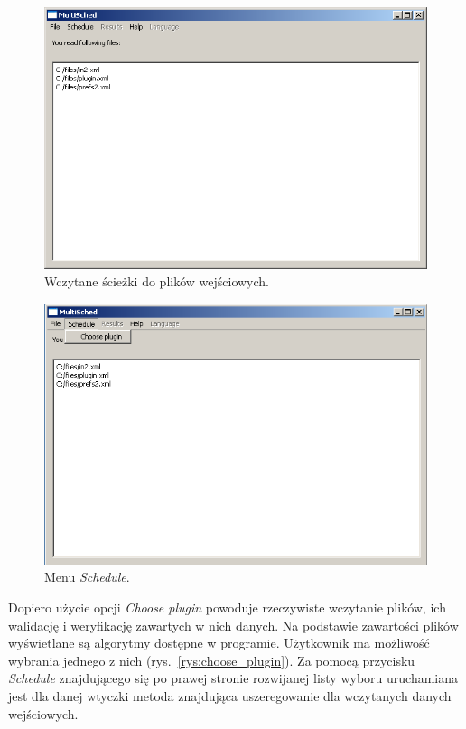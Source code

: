 \begin{figure}[htp]
\centering\includegraphics[scale=0.8]{figures/screens/read_files.png}
\caption{Wczytane ścieżki do plików wejściowych.}\label{rys:read_files}
\end{figure}

\begin{figure}[htp]
\centering\includegraphics[scale=0.8]{figures/screens/menu_schedule.png}
\caption{Menu \emph{Schedule}.}\label{rys:menu_schedule}
\end{figure}

Dopiero użycie opcji \emph{Choose plugin} powoduje rzeczywiste wczytanie plików, ich walidację i weryfikację zawartych w nich danych. Na podstawie 
zawartości plików wyświetlane są algorytmy dostępne w programie. Użytkownik ma możliwość wybrania jednego z nich (rys.~\vref{rys:choose_plugin}). Za pomocą 
przycisku \emph{Schedule} znajdującego się po prawej stronie rozwijanej listy wyboru uruchamiana jest dla danej wtyczki metoda znajdująca uszeregowanie 
dla wczytanych danych wejściowych.

